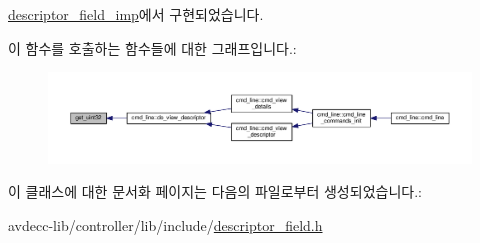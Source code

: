 \hyperlink{classavdecc__lib_1_1descriptor__field__imp_a81eef286a0ee26427be7d293279737e9}{descriptor\+\_\+field\+\_\+imp}에서 구현되었습니다.



이 함수를 호출하는 함수들에 대한 그래프입니다.\+:
\nopagebreak
\begin{figure}[H]
\begin{center}
\leavevmode
\includegraphics[width=350pt]{classavdecc__lib_1_1descriptor__field_a90fd17a46477c04335e6720cb99c107d_icgraph}
\end{center}
\end{figure}




이 클래스에 대한 문서화 페이지는 다음의 파일로부터 생성되었습니다.\+:\begin{DoxyCompactItemize}
\item 
avdecc-\/lib/controller/lib/include/\hyperlink{descriptor__field_8h}{descriptor\+\_\+field.\+h}\end{DoxyCompactItemize}
